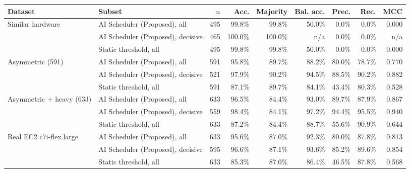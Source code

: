 \begin{tabular}{llrrrrrrr}
\toprule
Dataset & Subset & $n$ & Acc. & Majority & Bal. acc. & Prec. & Rec. & MCC \\
\midrule
Similar hardware & AI Scheduler (Proposed), all & 495 & 99.8\% & 99.8\% & 50.0\% & 0.0\% & 0.0\% & 0.000 \\
 & AI Scheduler (Proposed), decisive & 465 & 100.0\% & 100.0\% & n/a & 0.0\% & 0.0\% & n/a \\
 & Static threshold, all & 495 & 99.8\% & 99.8\% & 50.0\% & 0.0\% & 0.0\% & 0.000 \\
\midrule
Asymmetric (591) & AI Scheduler (Proposed), all & 591 & 95.8\% & 89.7\% & 88.2\% & 80.0\% & 78.7\% & 0.770 \\
 & AI Scheduler (Proposed), decisive & 521 & 97.9\% & 90.2\% & 94.5\% & 88.5\% & 90.2\% & 0.882 \\
 & Static threshold, all & 591 & 87.1\% & 89.7\% & 84.1\% & 43.4\% & 80.3\% & 0.528 \\
\midrule
Asymmetric + heavy (633) & AI Scheduler (Proposed), all & 633 & 96.5\% & 84.4\% & 93.0\% & 89.7\% & 87.9\% & 0.867 \\
 & AI Scheduler (Proposed), decisive & 559 & 98.4\% & 84.1\% & 97.2\% & 94.4\% & 95.5\% & 0.940 \\
 & Static threshold, all & 633 & 87.2\% & 84.4\% & 88.7\% & 55.6\% & 90.9\% & 0.644 \\
\midrule
Real EC2 c7i-flex.large & AI Scheduler (Proposed), all & 633 & 95.6\% & 87.0\% & 92.3\% & 80.0\% & 87.8\% & 0.813 \\
 & AI Scheduler (Proposed), decisive & 595 & 96.6\% & 87.1\% & 93.6\% & 85.2\% & 89.6\% & 0.854 \\
 & Static threshold, all & 633 & 85.3\% & 87.0\% & 86.4\% & 46.5\% & 87.8\% & 0.568 \\
\bottomrule
\end{tabular}

